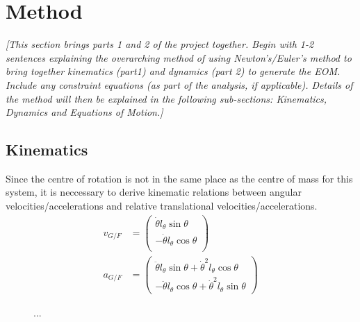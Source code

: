 \documentclass[11pt]{article}
\begin{document}
\section*{Method}\label{sec:method}
\textcolor[rgb]{0.80,0.29,0.09}{\textsl{[This section brings parts 1 and 2 of the project together. Begin with 1-2 sentences explaining the overarching method of using Newton’s/Euler’s method to bring together kinematics (part1) and dynamics (part 2) to generate the EOM.  Include any constraint equations (as part of the analysis, if applicable). Details of the method will then be explained in the following sub-sections: Kinematics, Dynamics and Equations of Motion.]}}


\subsection*{Kinematics}\label{sec:kin}
Since the centre of rotation is not in the same place as the centre of mass for this system, it is neccessary to derive kinematic relations between angular velocities/accelerations and relative translational velocities/accelerations.
\begin{align}
  v_{G/F} &=
  \begin{pmatrix}
     \dot{\theta}l_{\theta}\sin\theta \\
    -\dot{\theta}l_{\theta}\cos\theta \\
  \end{pmatrix} \label{eq:kin1} \\
  a_{G/F} &=
  \begin{pmatrix}
     \ddot{\theta}l_{\theta}\sin\theta + \dot{\theta}^2l_{\theta}\cos\theta \\
    -\ddot{\theta}l_{\theta}\cos\theta + \dot{\theta}^2l_{\theta}\sin\theta 
  \end{pmatrix} \label{eq:kin2}
\end{align}
\begin{figure}[h!]
  \centering
  \caption{...}\label{fig:kin_sketch}
\end{figure}

\end{document}
